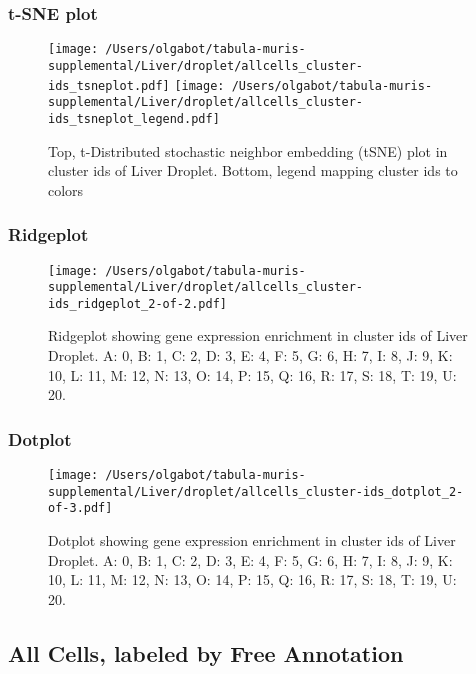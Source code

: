 \newpage
\subsubsection{t-SNE plot}
\begin{figure}[h]
\centering
\texttt{[image: /Users/olgabot/tabula-muris-supplemental/Liver/droplet/allcells\_cluster-ids\_tsneplot.pdf]}
\texttt{[image: /Users/olgabot/tabula-muris-supplemental/Liver/droplet/allcells\_cluster-ids\_tsneplot\_legend.pdf]}
\caption{Top, t-Distributed stochastic neighbor embedding (tSNE) plot  in cluster ids of Liver Droplet. Bottom, legend mapping cluster ids to colors}
\end{figure}


\newpage
\newpage
\subsubsection{Ridgeplot}
\begin{figure}[h]
\centering
\texttt{[image: /Users/olgabot/tabula-muris-supplemental/Liver/droplet/allcells\_cluster-ids\_ridgeplot\_2-of-2.pdf]}

\caption{ Ridgeplot  showing gene expression enrichment in cluster ids of Liver Droplet. A: 0, B: 1, C: 2, D: 3, E: 4, F: 5, G: 6, H: 7, I: 8, J: 9, K: 10, L: 11, M: 12, N: 13, O: 14, P: 15, Q: 16, R: 17, S: 18, T: 19, U: 20.}
\end{figure}


\newpage
\newpage
\subsubsection{Dotplot}
\begin{figure}[h]
\centering
\texttt{[image: /Users/olgabot/tabula-muris-supplemental/Liver/droplet/allcells\_cluster-ids\_dotplot\_2-of-3.pdf]}

\caption{ Dotplot  showing gene expression enrichment in cluster ids of Liver Droplet. A: 0, B: 1, C: 2, D: 3, E: 4, F: 5, G: 6, H: 7, I: 8, J: 9, K: 10, L: 11, M: 12, N: 13, O: 14, P: 15, Q: 16, R: 17, S: 18, T: 19, U: 20.}
\end{figure}


\newpage
\subsection{All Cells, labeled by Free Annotation}
